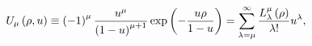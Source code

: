 \begin{equation}
U_{\mu }\left( \rho ,u\right) \equiv \left( -1\right) ^{\mu }\frac{u^{\mu }}{%
\left( 1-u\right) ^{\mu +1}}\exp \left( -\frac{u\rho }{1-u}\right)
=\sum_{\lambda =\mu }^{\infty }\frac{L_{\lambda }^{\mu }\left( \rho \right) 
}{\lambda !}u^{\lambda },
\end{equation}

